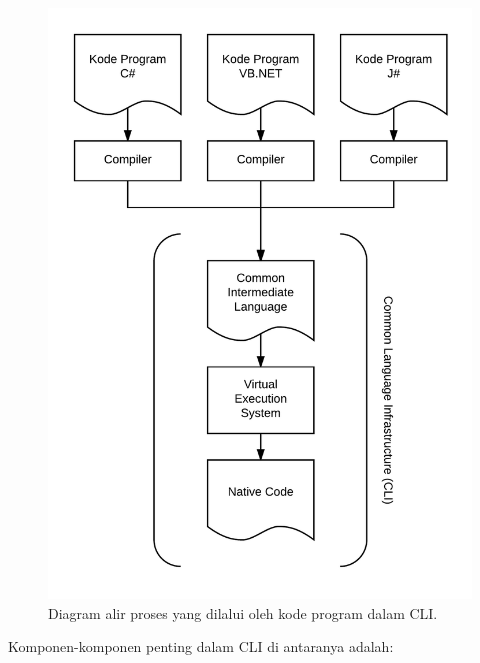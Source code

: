 \begin{figure}[h]
    \centering
    \includegraphics[scale=0.2]{Gambar/CLI.png}
    \caption[Diagram alir proses yang dilalui oleh kode program dalam CLI.]{Diagram alir proses yang dilalui oleh kode program dalam CLI.} 
    \label{fig:cli}
\end{figure}

Komponen-komponen penting dalam CLI di antaranya adalah\cite{CLI:2016}:

